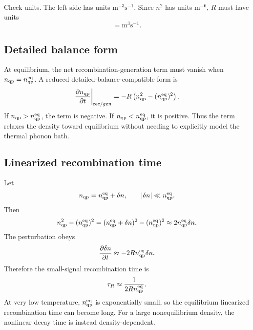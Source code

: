 \documentclass[11pt]{article}
\newcommand{\rec}{\mathrm{rec}}
\newcommand{\eq}{\mathrm{eq}}
\begin{document}
Check units. The left side has units $\mathrm{m}^{-3}\mathrm{s}^{-1}$. Since $n^2$ has units $\mathrm{m}^{-6}$, $R$ must have units
\begin{equation}
[R]=\mathrm{m}^3\mathrm{s}^{-1}.
\end{equation}

\subsection{Detailed balance form}
At equilibrium, the net recombination-generation term must vanish when $n_{\qp}=n_{\qp}^{\eq}$. A reduced detailed-balance-compatible form is
\begin{equation}
\left.\frac{\partial n_{\qp}}{\partial t}\right|_{\rec/gen}
=-R\left(n_{\qp}^2-(n_{\qp}^{\eq})^2\right).
\end{equation}
If $n_{\qp}>n_{\qp}^{\eq}$, the term is negative. If $n_{\qp}<n_{\qp}^{\eq}$, it is positive. Thus the term relaxes the density toward equilibrium without needing to explicitly model the thermal phonon bath.

\subsection{Linearized recombination time}
Let
\begin{equation}
 n_{\qp}=n_{\qp}^{\eq}+\delta n,
\qquad |\delta n|\ll n_{\qp}^{\eq}.
\end{equation}
Then
\begin{equation}
 n_{\qp}^2-(n_{\qp}^{\eq})^2
=(n_{\qp}^{\eq}+\delta n)^2-(n_{\qp}^{\eq})^2
\approx2n_{\qp}^{\eq}\delta n.
\end{equation}
The perturbation obeys
\begin{equation}
\frac{\partial \delta n}{\partial t}\approx-2R n_{\qp}^{\eq}\delta n.
\end{equation}
Therefore the small-signal recombination time is
\begin{equation}
 \tau_R\approx\frac{1}{2R n_{\qp}^{\eq}}.
\end{equation}
At very low temperature, $n_{\qp}^{\eq}$ is exponentially small, so the equilibrium linearized recombination time can become long. For a large nonequilibrium density, the nonlinear decay time is instead density-dependent.
\end{document}
